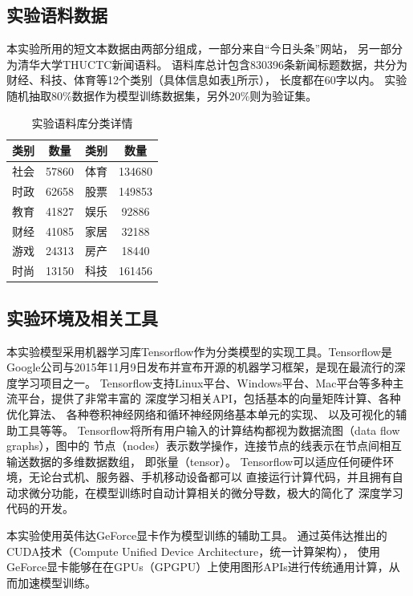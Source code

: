 \subsection{实验语料数据}
本实验所用的短文本数据由两部分组成，一部分来自“今日头条”网站，
另一部分为清华大学THUCTC新闻语料。
语料库总计包含830396条新闻标题数据，共分为财经、科技、体育等12个类别（具体信息如表\ref{train_data_table}所示），
长度都在60字以内。
实验随机抽取80\%数据作为模型训练数据集，另外20\%则为验证集。
\begin{table}[h]
    \caption{实验语料库分类详情}
    \begin{tabular}{|c|c|c|c|}
        \hline
        类别 & 数量 & 类别 & 数量 \\
        \hline
        社会 & 57860 & 体育 & 134680 \\
        \hline
        时政 & 62658 & 股票 & 149853 \\
        \hline
        教育 & 41827 & 娱乐 & 92886 \\
        \hline
        财经 & 41085 & 家居 & 32188 \\
        \hline
        游戏 & 24313 & 房产 & 18440 \\
        \hline
        时尚 & 13150 & 科技 & 161456 \\
        \hline
    \end{tabular}
    \label{train_data_table}
    \end{table}

\subsection{实验环境及相关工具}
本实验模型采用机器学习库Tensorflow作为分类模型的实现工具。Tensorflow是
Google公司与2015年11月9日发布并宣布开源的机器学习框架，是现在最流行的深度学习项目之一。
Tensorflow支持Linux平台、Windows平台、Mac平台等多种主流平台，提供了非常丰富的
深度学习相关API，包括基本的向量矩阵计算、各种优化算法、
各种卷积神经网络和循环神经网络基本单元的实现、
以及可视化的辅助工具等等。
Tensorflow将所有用户输入的计算结构都视为数据流图（data flow graphs），图中的
节点（nodes）表示数学操作，连接节点的线表示在节点间相互输送数据的多维数据数组，
即张量（tensor）。
Tensorflow可以适应任何硬件环境，无论台式机、服务器、手机移动设备都可以
直接运行计算代码，并且拥有自动求微分功能，在模型训练时自动计算相关的微分导数，极大的简化了
深度学习代码的开发。

本实验使用英伟达GeForce显卡作为模型训练的辅助工具。
通过英伟达推出的CUDA技术（Compute Unified Device Architecture，统一计算架构），
使用GeForce显卡能够在在GPUs（GPGPU）上使用图形APIs进行传统通用计算，从而加速模型训练。


